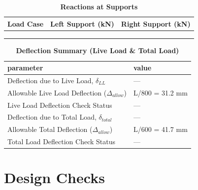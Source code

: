 \documentclass[12pt,a4paper]{report}
\numberwithin{table}{chapter}
\numberwithin{figure}{chapter}
\begin{document}
\vspace{1em}
\begin{longtable}{|>{\centering\arraybackslash}p{5.2cm}|>{\centering\arraybackslash}p{5.2cm}|>{\centering\arraybackslash}p{5.2cm}|}
\caption{\textbf{Reactions at Supports}}
\hline
\textbf{Load Case} & \textbf{Left Support (kN)} & \textbf{Right Support (kN)} \\[6pt]
\hline
 &  &  \\[6pt]
\hline
 &  &  \\[6pt]
\hline
 &  &  \\[6pt]
\hline
\end{longtable}

\vspace{1em}
\begin{longtable}{|L{7cm}|p{8.5cm}|}
\caption{\textbf{Deflection Summary (Live Load \& Total Load)}}
\hline
\textbf{parameter} & \textbf{value} \\
\hline
\textnormal{Deflection due to Live Load, $\delta_{LL}$} & --- \\[6pt]
\hline
\textnormal{Allowable Live Load Deflection ($\Delta_{allow}$)} & L/800 = 31.2 mm \\[6pt]
\hline
\textnormal{Live Load Deflection Check Status} & --- \\[6pt]
\hline
\textnormal{Deflection due to Total Load, $\delta_{total}$} & --- \\[6pt]
\hline
\textnormal{Allowable Total Deflection ($\Delta_{allow}$)} & L/600 = 41.7 mm \\[6pt]
\hline
\textnormal{Total Load Deflection Check Status} & --- \\[6pt]
\hline
\end{longtable}

\vspace{1em}
\noindent
\noindent{}
\noindent{}
\noindent{}


\chapter{Design Checks}
\end{document}
